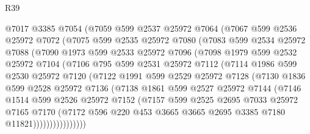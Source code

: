 \begin{lexlean}{R39}
\begin{coremodule}
        @7017
        @3385
        @7054
        (@7059
          @599
          @2537
          @25972
          @7064
          (@7067
            @599
            @2536
            @25972
            @7072
            (@7075
              @599
              @2535
              @25972
              @7080
              (@7083
                @599
                @2534
                @25972
                @7088
                (@7090
                  @1973
                  @599
                  @2533
                  @25972
                  @7096
                  (@7098
                    @1979
                    @599
                    @2532
                    @25972
                    @7104
                    (@7106
                      @795
                      @599
                      @2531
                      @25972
                      @7112
                      (@7114
                        @1986
                        @599
                        @2530
                        @25972
                        @7120
                        (@7122
                          @1991
                          @599
                          @2529
                          @25972
                          @7128
                          (@7130
                            @1836
                            @599
                            @2528
                            @25972
                            @7136
                            (@7138
                              @1861
                              @599
                              @2527
                              @25972
                              @7144
                              (@7146
                                @1514
                                @599
                                @2526
                                @25972
                                @7152
                                (@7157
                                  @599
                                  @2525
                                  @2695
                                  @7033
                                  @25972
                                  @7165
                                  @7170
                                  (@7172
                                    @596
                                    @220
                                    @453
                                    @3665
                                    @3665
                                    @2695
                                    @3385
                                    @7180
                                    @11821))))))))))))))))

\end{coremodule}
\end{lexlean}
